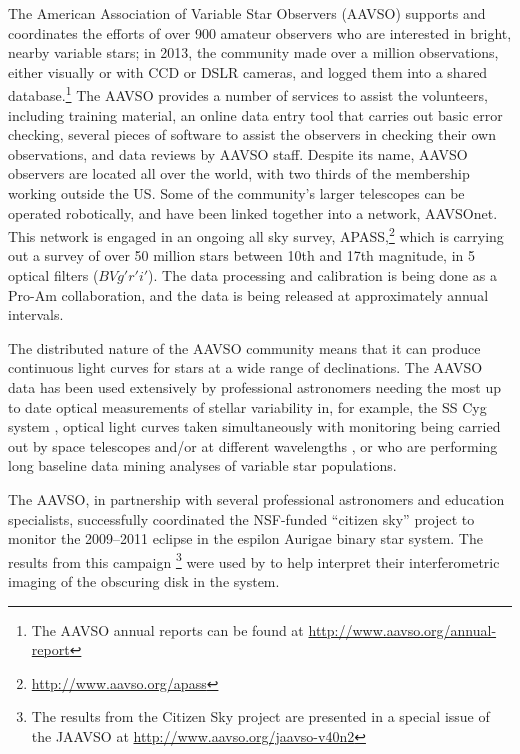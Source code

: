\documentclass{ar2e}
\begin{document}
The American Association of Variable Star Observers (AAVSO) supports and
coordinates the efforts of over 900 amateur observers who are interested in
bright, nearby variable stars; in 2013, the community made over a million
observations, either visually or with CCD or DSLR cameras, and logged them
into a shared database.\footnote{The AAVSO annual reports can be found at
\url{http://www.aavso.org/annual-report}} The AAVSO provides a number of
services to assist the volunteers, including training material, an online data
entry tool that carries out basic error checking, several pieces of
software to assist the observers in checking their own observations, and data
reviews by AAVSO staff. Despite its name, AAVSO observers are located all over
the world, with two thirds of the membership working outside the US. Some of
the community's larger telescopes can be operated robotically, and have been
linked together into a network, AAVSOnet. This network is engaged in an
ongoing all sky survey, APASS,\footnote{\url{http://www.aavso.org/apass}}
which is carrying out a survey of over 50 million stars between 10th and 17th
magnitude, in 5 optical filters ($BVg'r'i'$). The data processing and
calibration is being done as a Pro-Am collaboration, and the data is being
released at approximately annual intervals.

The distributed nature of the AAVSO community means that it can produce
continuous light curves for stars at a wide range of declinations. The AAVSO
data has been used extensively by professional astronomers needing the most 
up to date optical measurements of stellar variability in, for example, the 
SS Cyg system \citep{Miller-Jones++2013},  optical light curves taken
simultaneously with monitoring being carried out by space telescopes and/or at
different wavelengths \citep[see \eg][for a successful joint AAVSO--HST
program]{Szkody++2013},  or who are performing long baseline data mining
analyses of variable star populations. 

The AAVSO, in partnership with several professional astronomers and education
specialists, successfully coordinated the NSF-funded ``citizen sky'' project
to monitor the 2009--2011 eclipse in the espilon Aurigae binary star system.
The results from this campaign  \citep{Stencel2012}\footnote{The results from
the Citizen Sky project are presented in a special issue of the JAAVSO at 
\url{http://www.aavso.org/jaavso-v40n2}} were used by \citet{Kloppenborg++2010}
to help interpret their interferometric imaging of the obscuring disk in the
system.
\end{document}
